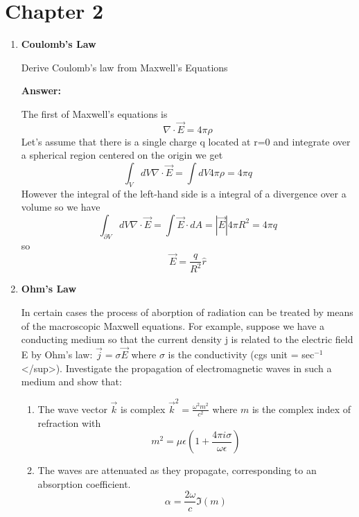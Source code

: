\documentclass{article}
\begin{document}
\fi
\section{Chapter 2}
\begin{enumerate}
\item{\bf  Coulomb's Law}

Derive Coulomb's law from Maxwell's Equations

{\bf Answer:}

The first of Maxwell's equations is
\begin{equation}
\nabla \cdot {\vec E} = 4 \pi \rho
\end{equation}
Let's assume that there is a single charge q located at r=0 and integrate over a spherical region centered on the origin we get
\begin{equation}
\int_V dV \nabla \cdot {\vec E} = \int dV 4 \pi \rho = 4 \pi q
\end{equation}
However the integral of the left-hand side is a integral of a divergence over a volume so we have
\begin{equation}
\int_{\partial V} dV \nabla \cdot {\vec E} = \int {\vec E} \cdot d A = |{\vec E}| 4 \pi R^2 = 4 \pi q
\end{equation}
so 
\begin{equation}
{\vec E} = \frac{q}{R^2} {\hat r}
\end{equation}

\item{\bf Ohm's Law}

In certain cases the process of aborption of radiation can be treated
by means of the macroscopic Maxwell equations. For example, suppose we
have a conducting medium so that the current density j is related to
the electric field E by Ohm's law: 
${\vec j} = \sigma {\vec E}$ where
$\sigma$ is the conductivity (cgs unit = sec$^{-1}$</sup>). 
Investigate the propagation of electromagnetic waves in such a medium
and show that:
\begin{enumerate}
\item
 The wave vector ${\vec k}$ is complex
 ${\vec k}^2 = \frac{\omega^2 m^2}{c^2}$
 where $m$ is the complex index of refraction with
 \begin{equation}
     m^2 = \mu \epsilon \left ( 1 + \frac{4 \pi i \sigma}{\omega \epsilon}
         \right )
         \end{equation}
\item The waves are attenuated as they propagate, corresponding to an
          absorption coefficient.
          \begin{equation}
          \alpha = \frac{2\omega}{c} \Im (m)
          \end{equation}


\end{enumerate}
\end{enumerate}
\end{document}

